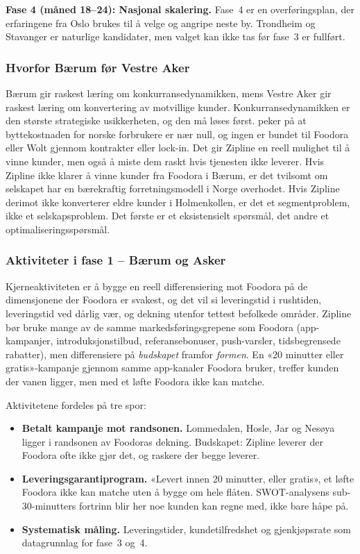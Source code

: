 \textbf{Fase 4 (måned 18--24): Nasjonal skalering.}
Fase~4 er en overføringsplan, der erfaringene fra Oslo brukes til å velge
og angripe neste by. Trondheim og Stavanger er naturlige kandidater, men
valget kan ikke tas før fase~3 er fullført.

\subsubsection{Hvorfor Bærum før Vestre Aker}

Bærum gir raskest læring om konkurransedynamikken, mens Vestre Aker gir
raskest læring om konvertering av motvillige kunder. Konkurransedynamikken
er den største strategiske usikkerheten, og den må løses først.
\textcite{porter1980} peker på at byttekostnaden for norske forbrukere er
nær null, og ingen er bundet til Foodora eller Wolt gjennom kontrakter
eller lock-in. Det gir Zipline en reell mulighet til å vinne kunder, men
også å miste dem raskt hvis tjenesten ikke leverer. Hvis Zipline ikke
klarer å vinne kunder fra Foodora i Bærum, er det tvilsomt om selskapet
har en bærekraftig forretningsmodell i Norge overhodet. Hvis Zipline
derimot ikke konverterer eldre kunder i Holmenkollen, er det et
segmentproblem, ikke et selskapsproblem. Det første er et eksistensielt
spørsmål, det andre et optimaliseringsspørsmål.

\subsubsection{Aktiviteter i fase 1 -- Bærum og Asker}

Kjerneaktiviteten er å bygge en reell differensiering mot Foodora på de
dimensjonene der Foodora er svakest, og det vil si leveringstid i
rushtiden, leveringstid ved dårlig vær, og dekning utenfor tettest
befolkede områder.
Zipline bør bruke mange av de samme markedsføringsgrepene som Foodora
(app-kampanjer, introduksjonstilbud, referansebonuser, push-varsler,
tidsbegrensede rabatter), men differensiere på \emph{budskapet} framfor
\emph{formen}. En «20 minutter eller gratis»-kampanje gjennom samme
app-kanaler Foodora bruker, treffer kunden der vanen ligger, men med et
løfte Foodora ikke kan matche.

Aktivitetene fordeles på tre spor:

\begin{itemize}[leftmargin=2em]
  \item \textbf{Betalt kampanje mot randsonen.} Lommedalen, Hosle, Jar og
  Nesøya ligger i randsonen av Foodoras dekning. Budskapet: Zipline
  leverer der Foodora ofte ikke gjør det, og raskere der begge leverer.
  \item \textbf{Leveringsgarantiprogram.} «Levert innen 20 minutter, eller
  gratis», et løfte Foodora ikke kan matche uten å bygge om hele
  flåten. SWOT-analysens sub-30-minutters fortrinn blir her noe kunden kan
  regne med, ikke bare håpe på.
  \item \textbf{Systematisk måling.} Leveringstider, kundetilfredshet og
  gjenkjøpsrate som datagrunnlag for fase~3 og~4.
\end{itemize}

